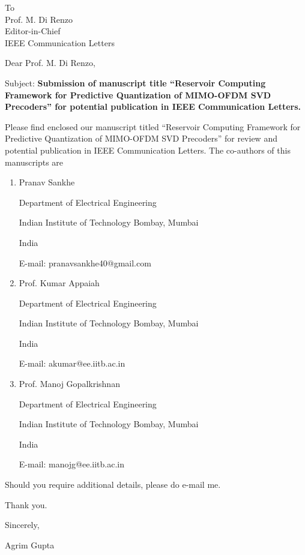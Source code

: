 \documentclass{letter}
\date{\today}
\begin{document}
\begin{letter}{To\\
Prof. M. Di Renzo\\
Editor-in-Chief\\
IEEE Communication Letters}
\vspace{0.5in}


\opening{Dear Prof. M. Di Renzo,} 

Subject: \textbf{Submission of manuscript title ``Reservoir Computing Framework for Predictive Quantization of MIMO-OFDM SVD Precoders'' for potential publication in
  IEEE Communication Letters.}

Please find enclosed our manuscript titled ``Reservoir Computing Framework for Predictive Quantization of MIMO-OFDM SVD Precoders'' for review and potential
  publication in IEEE Communication Letters. The co-authors of this manuscripts are
\begin{enumerate}
\item  Pranav Sankhe

Department of Electrical  Engineering

Indian Institute of Technology Bombay, Mumbai

India

E-mail: pranavsankhe40@gmail.com


\item Prof. Kumar Appaiah

Department of Electrical  Engineering

Indian Institute of Technology Bombay, Mumbai

India

E-mail: akumar@ee.iitb.ac.in


\item Prof. Manoj Gopalkrishnan

Department of Electrical  Engineering

Indian Institute of Technology Bombay, Mumbai

India

E-mail: manojg@ee.iitb.ac.in

\end{enumerate}

Should you require additional details, please do e-mail me.

Thank you.
\vspace{0.3in}

Sincerely,

Agrim Gupta

\end{letter}
\end{document}
